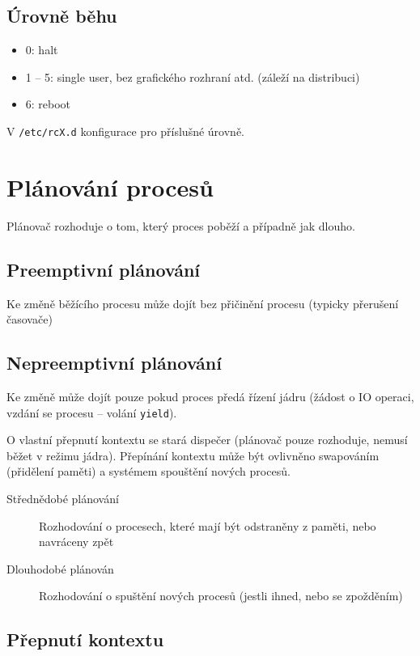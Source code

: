 \documentclass[a4wide]{report}
\begin{document}
\subsection{Úrovně běhu}
\begin{itemize}
	\item 0: halt
	\item 1 -- 5: single user, bez grafického rozhraní atd. (záleží na distribuci)
	\item 6: reboot
\end{itemize}

V \verb|/etc/rcX.d| konfigurace pro příslušné úrovně.

\section{Plánování procesů}

Plánovač rozhoduje o tom, který proces poběží a případně jak dlouho.

\subsection{Preemptivní plánování}

Ke změně běžícího procesu může dojít bez přičinění procesu (typicky přerušení časovače)

\subsection{Nepreemptivní plánování}

Ke změně může dojít pouze pokud proces předá řízení jádru (žádost o IO operaci, vzdání se procesu -- volání \verb|yield|).

O vlastní přepnutí kontextu se stará dispečer (plánovač pouze rozhoduje, nemusí běžet v režimu jádra). Přepínání kontextu může být ovlivněno swapováním (přidělení paměti) a systémem spouštění nových procesů.

\begin{description}
	\item[Střednědobé plánování] Rozhodování o procesech, které mají být odstraněny z paměti, nebo navráceny zpět
	\item[Dlouhodobé plánován] Rozhodování o spuštění nových procesů (jestli ihned, nebo se zpožděním)
\end{description}

\subsection{Přepnutí kontextu}
\end{document}
